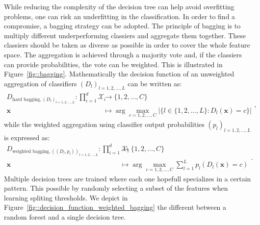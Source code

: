                 While reducing the complexity of the decision tree can help avoid overfitting problems, one can risk an underfitting in the classification.
                In order to find a compromise, a bagging strategy can be adopted.
                The principle of bagging is to multiply different underperforming classiers and aggregate them together.
                These classiers should be taken as diverse as possible in order to cover the whole feature space.
                The aggregation is achieved through a majority vote and, if the classiers can provide probabilities, the vote can be weighted.
                This is illustrated in Figure~\ref{fig::bagging}.
                Mathematically the decision function of an unweighted aggregation of classifiers $\left(D_l\right)_{l=1,2,\dots,L}$ can be written as:
                \begin{equation}
                    \label{eq::decision_function_hard_bagging}
                    \begin{aligned}
                        D_{\text{hard bagging}, \left(D_l\right)_{l=1,2,\dots,L}}: \prod_{i=1}^{d}\mathscr{X}_i &\rightarrow \{1,2,\dots,C\}\\
                        \bm{x} &\mapsto \arg \max_{c=1,2,\dots,C}\lvert\{l\in\{1,2,\dots,L\}: D_l(\bm{x}) = c\}\rvert
                    \end{aligned},
                \end{equation}
                while the weighted aggregation using classifier output probabilities $\left(p_l\right)_{l=1,2,\dots,L}$ is expressed as:
                \begin{equation}
                    \label{eq::decision_function_weighted_bagging}
                    \begin{aligned}
                        D_{\text{weighted bagging}, \left((D_l, p_l)\right)_{l=1,2,\dots,L}}: \prod_{i=1}^{d}\mathscr{X}_i &\rightarrow \{1,2,\dots,C\}\\
                        \bm{x} &\mapsto \arg \max_{c=1,2,\dots,C} \sum_{l=1}^{L} p_l\left(D_l(\bm{x}) = c\right) 
                    \end{aligned}.
                \end{equation}
                Multiple decision trees are trained where each one hopefull specializes in a certain pattern.
                This possible by randomly selecting a subset of the features when learning spliting thresholds.
                We depict in Figure~\ref{fig::decision_function_weighted_bagging} the different between a random forest and a single decision tree.
